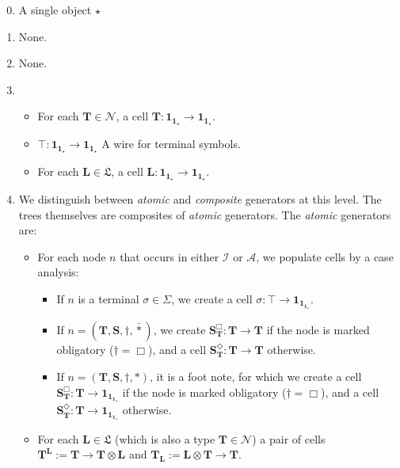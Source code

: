 \begin{fullwidth}
\begin{defn}
\begin{enumerate}
\setcounter{enumi}{-1}
\item{A single object $\star$}
\item{None.}
\item{None.}
\item{
	\begin{itemize}
	\item{For each $\mathbf{T} \in \mathcal{N}$, a cell $\mathbf{T}: \mathbf{1}_{\mathbf{1}_\star} \rightarrow \mathbf{1}_{\mathbf{1}_\star}$.}
	\item{$\top: \mathbf{1}_{\mathbf{1}_\star} \rightarrow \mathbf{1}_{\mathbf{1}_\star}$ A wire for terminal symbols.}
	\item{For each $\mathbf{L} \in \mathfrak{L}$, a cell $\mathbf{L} : \mathbf{1}_{\mathbf{1}_\star} \rightarrow \mathbf{1}_{\mathbf{1}_\star}$.}
	\end{itemize}
}
\item{
	We distinguish between \emph{atomic} and \emph{composite} generators at this level. The trees themselves are composites of \emph{atomic} generators. The \emph{atomic} generators are:
	\begin{itemize}
	\item{For each node $n$ that occurs in either $\mathcal{I}$ or $\mathcal{A}$, we populate cells by a case analysis:
	\begin{itemize}
		\item{If $n$ is a terminal $\sigma \in \Sigma$, we create a cell $\sigma: \top \rightarrow \mathbf{1}_{\mathbf{1}_{\mathbf{1}_\star}}$.}
		\item{If $n = (\mathbf{T},\mathbf{S},\dagger,\bar{*})$, we create $\mathbf{S}_\mathbf{T}^\Box: \mathbf{T} \rightarrow \mathbf{T}$ if the node is marked obligatory ($\dagger = \Box$), and a cell $\mathbf{S}_\mathbf{T}^\Diamond: \mathbf{T} \rightarrow \mathbf{T}$ otherwise.}
		\item{If $n = (\mathbf{T},\mathbf{S},\dagger,*)$, it is a foot note, for which we create a cell $\mathbf{S}_\mathbf{T}^\Box: \mathbf{T} \rightarrow \mathbf{1}_{\mathbf{1}_{\mathbf{1}_\star}}$ if the node is marked obligatory ($\dagger = \Box$), and a cell $\mathbf{S}_\mathbf{T}^\Diamond: \mathbf{T} \rightarrow \mathbf{1}_{\mathbf{1}_{\mathbf{1}_\star}}$ otherwise.}
	\end{itemize}
	}
	\item{For each $\mathbf{L} \in \mathfrak{L}$ (which is also a type $\mathbf{T} \in \mathcal{N}$) a pair of cells $\mathbf{T}^\mathbf{L} := \mathbf{T} \rightarrow \mathbf{T} \otimes \mathbf{L}$ and $\mathbf{T}_\mathbf{L} := \mathbf{L} \otimes \mathbf{T} \rightarrow \mathbf{T}$.}

\end{itemize}}
\end{enumerate}
\end{defn}
\end{fullwidth}
